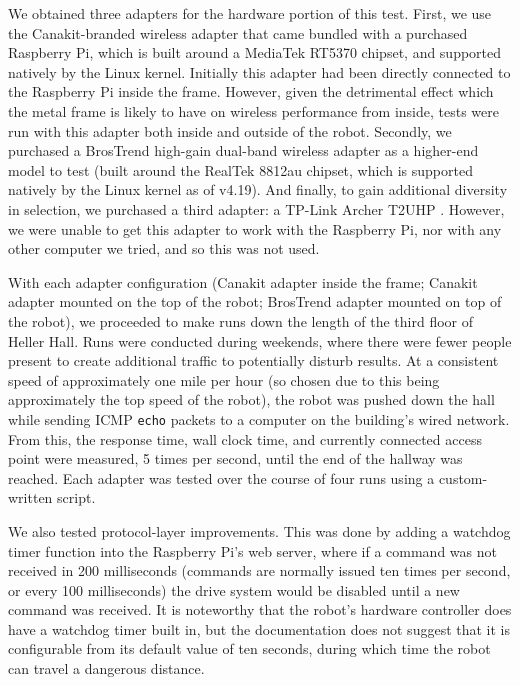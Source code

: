 \documentclass{IEEEtran}
\begin{document}
We obtained three adapters for the hardware portion of this test. First, we
use the Canakit-branded wireless adapter that came bundled with a purchased
Raspberry Pi\cite{canakit}, which is built around a MediaTek RT5370 chipset,
and supported natively by the Linux kernel. Initially this adapter had been
directly connected to the Raspberry Pi inside the frame. However, given the
detrimental effect which the metal frame is likely to have on wireless 
performance from inside, tests were run with this adapter both inside and
outside of the robot. Secondly, we purchased a BrosTrend high-gain dual-band
wireless adapter as a higher-end model to test\cite{brostrend} (built around
the RealTek 8812au chipset, which is supported natively by the Linux kernel
as of v4.19). And finally, to gain additional diversity in selection, we
purchased a third adapter: a TP-Link Archer T2UHP \cite{archer}. However,
we were unable to get this adapter to work with the Raspberry Pi, nor with
any other computer we tried, and so this was not used.

With each adapter configuration (Canakit adapter inside the frame; Canakit
adapter mounted on the top of the robot; BrosTrend adapter mounted on top
of the robot), we proceeded to make runs down the length of the third
floor of Heller Hall. Runs were conducted during weekends, where there were
fewer people present to create additional traffic to potentially disturb
results. At a consistent speed of approximately one mile per hour (so chosen
due to this being approximately the top speed of the robot), the robot was
pushed down the hall while sending ICMP \texttt{echo} packets to a computer
on the building's wired network. From this, the response time, wall clock
time, and currently connected access point were measured, 5 times per second,
until the end of the hallway was reached. Each adapter was tested over the
course of four runs using a custom-written script\cite{hallway-script}.

We also tested protocol-layer improvements. This was done by adding a
watchdog timer function\cite{watchdog} into the Raspberry Pi's web server,
where if a command was not received in 200 milliseconds (commands are
normally issued ten times per second, or every 100 milliseconds) the drive
system would be disabled until a new command was received. It is noteworthy
that the robot's hardware controller does have a watchdog timer built in, but
the documentation does not suggest that it is configurable from its default
value of ten seconds, during which time the robot can travel a dangerous
distance.
\end{document}

